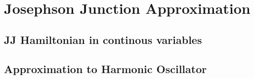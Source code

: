 \section{Josephson Junction Approximation}

\subsection{JJ Hamiltonian in continous variables}


\subsection{Approximation to Harmonic Oscillator}

